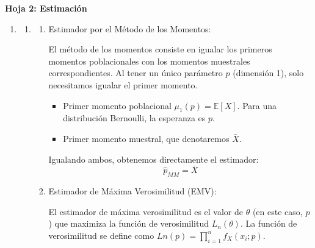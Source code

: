 \begin{center}
	\Large \textbf{Hoja 2: Estimación}
\end{center}

\begin{enumerate}[label=\color{red}\textbf{\arabic*)}]
	\item {}
	      \begin{enumerate}[label=\color{red}\textbf{\alph*)}]
		      \item {}
		            \begin{enumerate}[label=\arabic*)]
			            \item Estimador por el Método de los Momentos:

			                  El método de los momentos consiste en igualar los primeros momentos poblacionales con los momentos muestrales correspondientes. Al tener un único parámetro $p$ (dimensión 1), solo necesitamos igualar el primer momento.
			                  \begin{itemize}[label=\textbullet]
				                  \item  Primer momento poblacional $\mu_1(p)=\mathbb{E}[X]$. Para una distribución Bernoulli, la esperanza es $p$.
				                  \item Primer momento muestral, que denotaremos $\bar{X}$.
			                  \end{itemize}
			                  Igualando ambos, obtenemos directamente el estimador: \[
				                  \hat{p}_{MM}=\bar{X}
			                  \]
			            \item Estimador de Máxima Verosimilitud (EMV):

			                  El estimador de máxima verosimilitud es el valor de $\theta$ (en este caso, $p$) que maximiza la función de verosimilitud $L_n(\theta)$. La función de verosimilitud se define como $Ln(p)=\prod_{i=1}^{n} f_X(x_i;p) $.


\end{enumerate}
\end{enumerate}
\end{enumerate}
